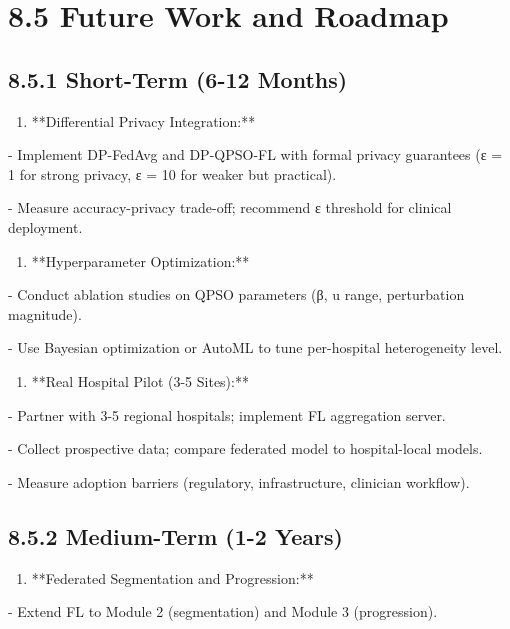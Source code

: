 \section{8.5 Future Work and Roadmap}

\subsection{8.5.1 Short-Term (6-12 Months)}
\begin{enumerate}
  \item **Differential Privacy Integration:**
\end{enumerate}

- Implement DP-FedAvg and DP-QPSO-FL with formal privacy guarantees (ε = 1 for strong privacy, ε = 10 for weaker but practical).

- Measure accuracy-privacy trade-off; recommend ε threshold for clinical deployment.

\begin{enumerate}
  \item **Hyperparameter Optimization:**
\end{enumerate}

- Conduct ablation studies on QPSO parameters (β, u range, perturbation magnitude).

- Use Bayesian optimization or AutoML to tune per-hospital heterogeneity level.

\begin{enumerate}
  \item **Real Hospital Pilot (3-5 Sites):**
\end{enumerate}

- Partner with 3-5 regional hospitals; implement FL aggregation server.

- Collect prospective data; compare federated model to hospital-local models.

- Measure adoption barriers (regulatory, infrastructure, clinician workflow).


\subsection{8.5.2 Medium-Term (1-2 Years)}
\begin{enumerate}
  \item **Federated Segmentation and Progression:**
\end{enumerate}

- Extend FL to Module 2 (segmentation) and Module 3 (progression).

